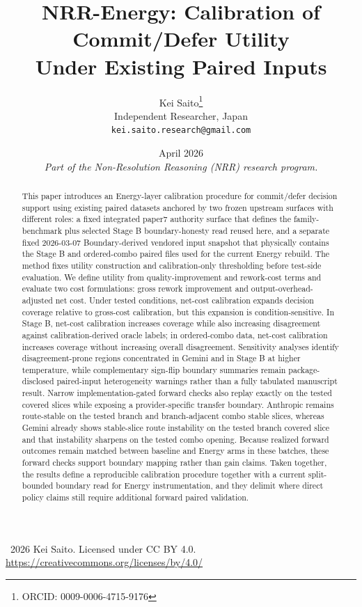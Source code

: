 \documentclass[11pt,a4paper]{article}
\title{\textbf{NRR-Energy: Calibration of Commit/Defer Utility\\Under Existing Paired Inputs}}
\author{
  Kei Saito\thanks{ORCID: 0009-0006-4715-9176} \\
  Independent Researcher, Japan \\
  \texttt{kei.saito.research@gmail.com}
}
\date{April 2026 \\[0.5em]
\textit{Part of the Non-Resolution Reasoning (NRR) research program.}}
\begin{document}
\maketitle

\begin{center}
\textcopyright\ 2026 Kei Saito.
Licensed under CC BY 4.0.\\
\url{https://creativecommons.org/licenses/by/4.0/}
\end{center}

\begin{abstract}
This paper introduces an Energy-layer calibration procedure for commit/defer decision support using existing paired datasets anchored by two frozen upstream surfaces with different roles: a fixed integrated paper7 authority surface that defines the family-benchmark plus selected Stage B boundary-honesty read reused here, and a separate fixed 2026-03-07 Boundary-derived vendored input snapshot that physically contains the Stage B and ordered-combo paired files used for the current Energy rebuild. The method fixes utility construction and calibration-only thresholding before test-side evaluation. We define utility from quality-improvement and rework-cost terms and evaluate two cost formulations: gross rework improvement and output-overhead-adjusted net cost. Under tested conditions, net-cost calibration expands decision coverage relative to gross-cost calibration, but this expansion is condition-sensitive. In Stage B, net-cost calibration increases coverage while also increasing disagreement against calibration-derived oracle labels; in ordered-combo data, net-cost calibration increases coverage without increasing overall disagreement. Sensitivity analyses identify disagreement-prone regions concentrated in Gemini and in Stage B at higher temperature, while complementary sign-flip boundary summaries remain package-disclosed paired-input heterogeneity warnings rather than a fully tabulated manuscript result. Narrow implementation-gated forward checks also replay exactly on the tested covered slices while exposing a provider-specific transfer boundary. Anthropic remains route-stable on the tested branch and branch-adjacent combo stable slices, whereas Gemini already shows stable-slice route instability on the tested branch covered slice and that instability sharpens on the tested combo opening. Because realized forward outcomes remain matched between baseline and Energy arms in these batches, these forward checks support boundary mapping rather than gain claims. Taken together, the results define a reproducible calibration procedure together with a current split-bounded boundary read for Energy instrumentation, and they delimit where direct policy claims still require additional forward paired validation.
\end{abstract}
\end{document}
